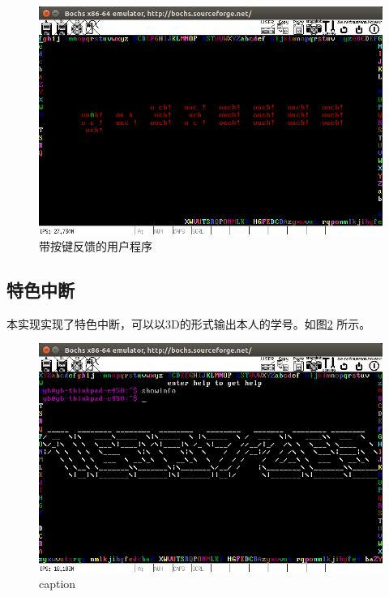 \documentclass[a4paper]{article}
\begin{document}
\begin{figure}
    \begin{center}
    \includegraphics[scale=0.5]{assets/user.png}
    \caption{带按键反馈的用户程序\label{fig:user}} 
    \end{center} 
\end{figure} 

\subsection{特色中断}
本实现实现了特色中断，可以以3D的形式输出本人的学号。如图\ref{fig:3_D_id}
所示。

\begin{figure}
    \begin{center}
    \includegraphics[scale=0.5]{assets/16337269.png}
    \caption{caption\label{fig:3_D_id}} 
    \end{center} 
\end{figure} 
\end{document}
